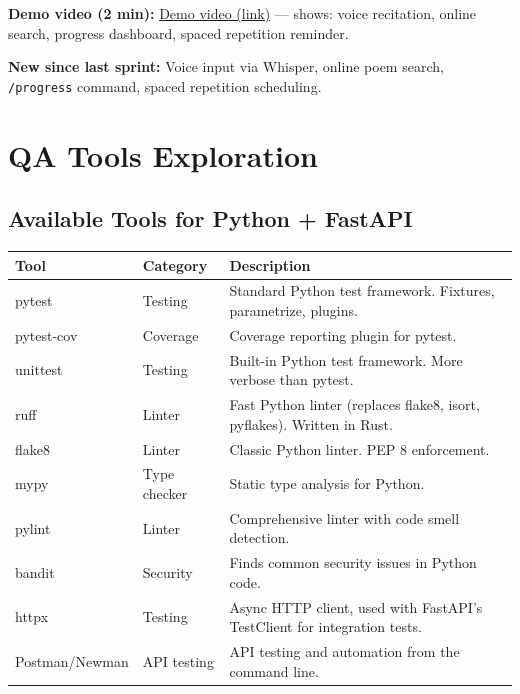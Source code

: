 \documentclass[11pt, a4paper]{article}
\begin{document}
\textbf{Demo video (2 min):} \href{https://DEMO_VIDEO_LINK_HERE}{Demo video (link)} --- shows: voice recitation, online search, progress dashboard, spaced repetition reminder.

\textbf{New since last sprint:} Voice input via Whisper, online poem search, \texttt{/progress} command, spaced repetition scheduling.


\section{QA Tools Exploration}

\subsection*{Available Tools for Python + FastAPI}

\begin{center}
\footnotesize
\begin{tabularx}{\textwidth}{l|l|X}
\toprule
\textbf{Tool} & \textbf{Category} & \textbf{Description} \\
\midrule
pytest & Testing & Standard Python test framework. Fixtures, parametrize, plugins. \\
pytest-cov & Coverage & Coverage reporting plugin for pytest. \\
unittest & Testing & Built-in Python test framework. More verbose than pytest. \\
ruff & Linter & Fast Python linter (replaces flake8, isort, pyflakes). Written in Rust. \\
flake8 & Linter & Classic Python linter. PEP 8 enforcement. \\
mypy & Type checker & Static type analysis for Python. \\
pylint & Linter & Comprehensive linter with code smell detection. \\
bandit & Security & Finds common security issues in Python code. \\
httpx & Testing & Async HTTP client, used with FastAPI's TestClient for integration tests. \\
Postman/Newman & API testing & API testing and automation from the command line. \\
\bottomrule
\end{tabularx}
\end{center}
\end{document}
